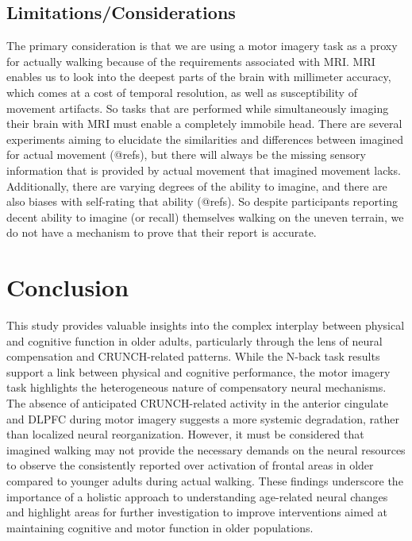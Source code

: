 \documentclass[a4paper,fleqn]{cas-sc}
\begin{document}
\subsection{Limitations/Considerations}
The primary consideration is that we are using a motor imagery task as a proxy for actually walking because of the requirements associated with MRI. MRI enables us to look into the deepest parts of the brain with millimeter accuracy, which comes at a cost of temporal resolution, as well as susceptibility of movement artifacts. So tasks that are performed while simultaneously imaging their brain with MRI must enable a completely immobile head. There are several experiments aiming to elucidate the similarities and differences between imagined for actual movement (@refs), but there will always be the missing sensory information that is provided by actual movement that imagined movement lacks. Additionally, there are varying degrees of the ability to imagine, and there are also biases with self-rating that ability (@refs). So despite participants reporting decent ability to imagine (or recall) themselves walking on the uneven terrain, we do not have a mechanism to prove that their report is accurate.




\section{Conclusion}
This study provides valuable insights into the complex interplay between physical and cognitive function in older adults, particularly through the lens of neural compensation and CRUNCH-related patterns. While the N-back task results support a link between physical and cognitive performance, the motor imagery task highlights the heterogeneous nature of compensatory neural mechanisms. The absence of anticipated CRUNCH-related activity in the anterior cingulate and DLPFC during motor imagery suggests a more systemic degradation, rather than localized neural reorganization. However, it must be considered that imagined walking may not provide the necessary demands on the neural resources to observe the consistently reported over activation of frontal areas in older compared to younger adults during actual walking. These findings underscore the importance of a holistic approach to understanding age-related neural changes and highlight areas for further investigation to improve interventions aimed at maintaining cognitive and motor function in older populations.
\end{document}
